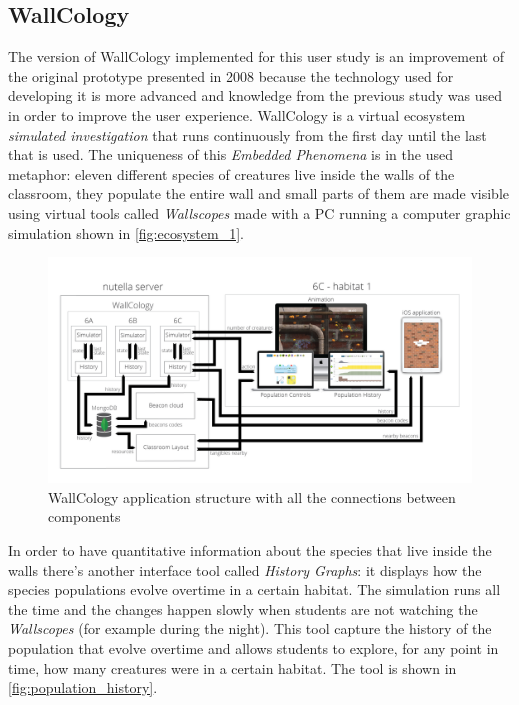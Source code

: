 \subsection{WallCology}
The version of WallCology implemented for this user study is an improvement of the original prototype presented in 2008 because the technology used for developing it is more advanced and knowledge from the previous study was used in order to improve the user experience. WallCology is a virtual ecosystem \textit{simulated investigation} that runs continuously from the first day until the last that is used. The uniqueness of this \textit{Embedded Phenomena} is in the used metaphor: eleven different species of creatures live inside the walls of the classroom, they populate the entire wall and small parts of them are made visible using virtual tools called \textit{Wallscopes} made with a PC running a computer graphic simulation shown in \ref{fig:ecosystem_1}. 

\begin{figure}
\centering
\includegraphics[width=6in]{images/wallcology-structure.png}
\caption{WallCology application structure with all the connections between components}
\label{fig:wallscopes}
\end{figure}

In order to have quantitative information about the species that live inside the walls there's another interface tool called \textit{History Graphs}: it displays how the species populations evolve overtime in a certain habitat. The simulation runs all the time and the changes happen slowly when students are not watching the \textit{Wallscopes} (for example during the night). This tool capture the history of the population that evolve overtime and allows students to explore, for any point in time, how many creatures were in a certain habitat. The tool is shown in \ref{fig:population_history}.

